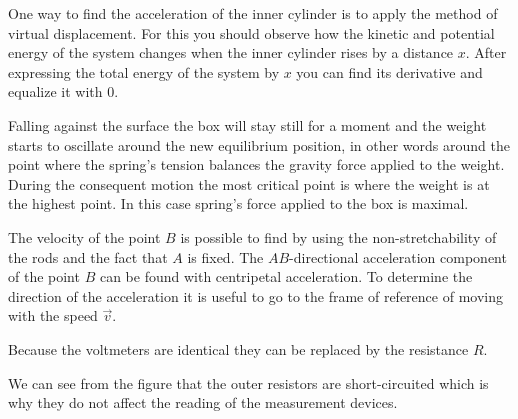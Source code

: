 \documentclass[11pt]{article}
\begin{document}

\hinteng
One way to find the acceleration of the inner cylinder is to apply the method of virtual displacement. For this you should observe how the kinetic and potential energy of the system changes when the inner cylinder rises by a distance $x$. After expressing the total energy of the system by $x$ you can find its derivative and equalize it with 0.
\probend
\bigskip


\hinteng
Falling against the surface the box will stay still for a moment and the weight starts to oscillate around the new equilibrium position, in other words around the point where the spring’s tension balances the gravity force applied to the weight. During the consequent motion the most critical point is where the weight is at the highest point. In this case spring’s force applied to the box is maximal.
\probend
\bigskip


\hinteng
The velocity of the point $B$ is possible to find by using the non-stretchability of the rods and the fact that $A$ is fixed. The $AB$-directional acceleration component of the point $B$ can be found with centripetal acceleration. To determine the direction of the acceleration it is useful to go to the frame of reference of moving with the speed $\vec{v}$.
\probend
\bigskip


\hinteng
Because the voltmeters are identical they can be replaced by the resistance $R$.
\probend
\bigskip


\hinteng
We can see from the figure that the outer resistors are short-circuited which is why they do not affect the reading of the measurement devices.
\probend
\bigskip

\end{document}

